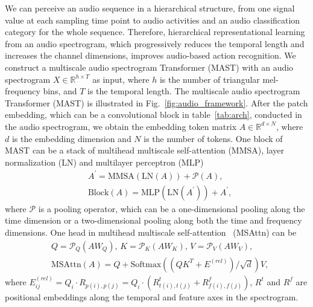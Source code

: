 \documentclass{article}
\begin{document}
We can perceive an audio sequence in a hierarchical structure, from one signal value at each sampling time point to audio activities and an audio classification category for the whole sequence. Therefore, hierarchical representational learning from an audio spectrogram, which progressively reduces the temporal length and increases the channel dimensions, improves audio-based action recognition. We construct a multiscale audio spectrogram Transformer (MAST) with an audio spectrogram $X \in \mathbb{R}^{h\times T}$ as input, where $h$ is the number of triangular mel-frequency bins, and $T$ is the temporal length. The multiscale audio spectrogram Transformer (MAST) is illustrated in Fig.~\ref{fig:audio_framework}. After the patch embedding, which can be a convolutional block in table~\ref{tab:arch}, conducted in the audio spectrogram, we obtain the embedding token matrix $A \in \mathbb{R}^{d\times N}$, where $d$ is the embedding dimension and $N$ is the number of tokens. One block of MAST can be a stack of multihead multiscale self-attention (MMSA), layer normalization (LN) and multilayer perceptron (MLP)
\begin{equation}\label{eq:mat}
\begin{aligned}
    &A^{\prime} = \text{MMSA}( \text{LN} (A) ) + \mathcal{P}(A), \\ &\text{Block}(A) = \text{MLP} ( \text{LN} (A^{\prime}) ) + A^{\prime},
\end{aligned}
\end{equation}
where $\mathcal{P}$ is a pooling operator, which can be a one-dimensional pooling along the time dimension or a two-dimensional pooling along both the time and frequency dimensions. One head in multihead multiscale self-attention~\cite{li2021improved} (MSAttn) can be \begin{equation}
\begin{aligned}
    &Q = \mathcal{P}_Q (A W_Q), \, K = \mathcal{P}_K (A W_K), \, V = \mathcal{P}_V (A W_V), \\ &\text{MSAttn}(A) = Q + \text{Softmax}((QK^T + E^{(rel)}) / \sqrt{d} )V,
\end{aligned}
\end{equation}
where $E^{(rel)}_{ij} = Q_i \cdot R_{p(i),p(j)} = Q_i \cdot (R^t_{t(i),t(j)} + R^f_{f(i),f(j)})$, $R^t$ and $R^f$ are positional embeddings along the temporal and feature axes in the spectrogram.  
\end{document}
